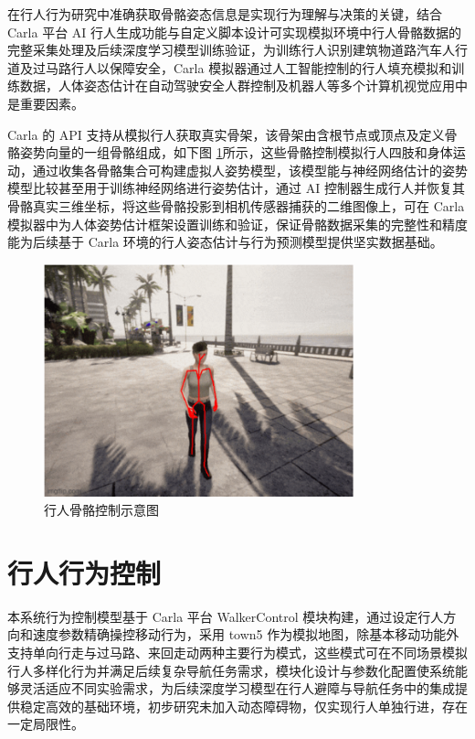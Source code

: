 在行人行为研究中准确获取骨骼姿态信息是实现行为理解与决策的关键，结合 Carla 平台 AI 行人生成功能与自定义脚本设计可实现模拟环境中行人骨骼数据的完整采集处理及后续深度学习模型训练验证，为训练行人识别建筑物道路汽车人行道及过马路行人以保障安全，Carla 模拟器通过人工智能控制的行人填充模拟和训练数据，人体姿态估计在自动驾驶安全人群控制及机器人等多个计算机视觉应用中是重要因素。

Carla 的 API 支持从模拟行人获取真实骨架，该骨架由含根节点或顶点及定义骨骼姿势向量的一组骨骼组成\cite{openhutb2025}，如下图 \ref{fig:pedestrian_skeleton}所示，这些骨骼控制模拟行人四肢和身体运动，通过收集各骨骼集合可构建虚拟人姿势模型，该模型能与神经网络估计的姿势模型比较甚至用于训练神经网络进行姿势估计，通过 AI 控制器生成行人并恢复其骨骼真实三维坐标，将这些骨骼投影到相机传感器捕获的二维图像上，可在 Carla 模拟器中为人体姿势估计框架设置训练和验证，保证骨骼数据采集的完整性和精度能为后续基于 Carla 环境的行人姿态估计与行为预测模型提供坚实数据基础。

\begin{figure}[H]
    \centering
    \includegraphics[width=0.8\textwidth]{images/pedestrian_skeleton.pdf}
    \caption{行人骨骼控制示意图}
    \label{fig:pedestrian_skeleton}
\end{figure}

\section{行人行为控制}
本系统行为控制模型基于 Carla 平台 WalkerControl 模块构建，通过设定行人方向和速度参数精确操控移动行为，采用 town5 作为模拟地图，除基本移动功能外支持单向行走与过马路、来回走动两种主要行为模式，这些模式可在不同场景模拟行人多样化行为并满足后续复杂导航任务需求，模块化设计与参数化配置使系统能够灵活适应不同实验需求，为后续深度学习模型在行人避障与导航任务中的集成提供稳定高效的基础环境，初步研究未加入动态障碍物，仅实现行人单独行进，存在一定局限性。\cite{csdn2023carla}

